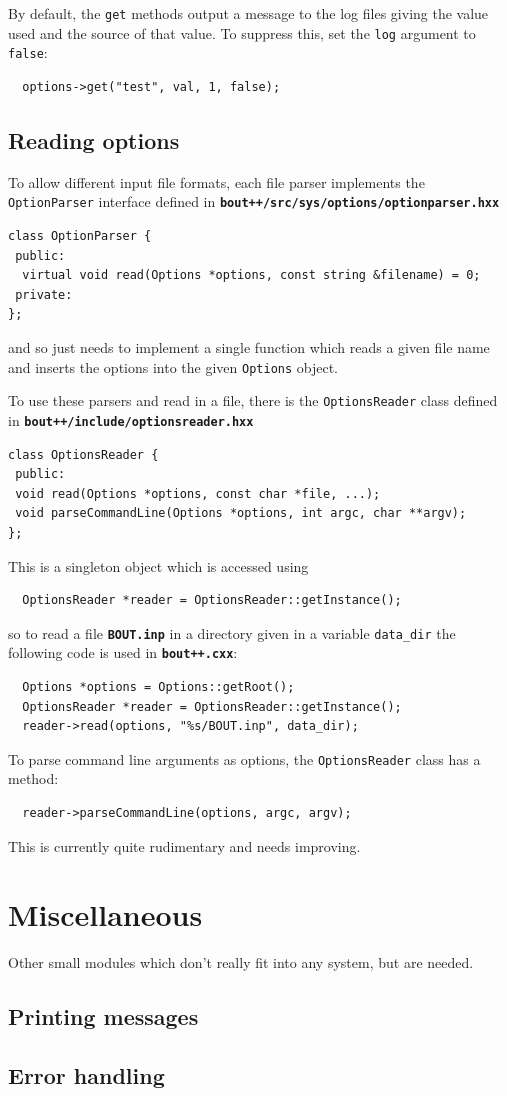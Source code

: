 \documentclass[12pt]{article}
\newcommand{\file}[1]{\texttt{\bf #1}}
\begin{document}
By default, the \lstinline!get! methods output a message to
the log files giving the value used and the source of that value.
To suppress this, set the \lstinline!log! argument to \lstinline!false!:
\begin{lstlisting}
  options->get("test", val, 1, false);
\end{lstlisting}

\subsection{Reading options}

To allow different input file formats, each file parser implements
the \lstinline!OptionParser! interface defined in
\file{bout++/src/sys/options/optionparser.hxx}
\begin{lstlisting}
class OptionParser {
 public:
  virtual void read(Options *options, const string &filename) = 0;
 private:
};
\end{lstlisting}
and so just needs to implement a single function which reads a
given file name and inserts the options into the given \lstinline!Options!
object.

To use these parsers and read in a file, there is the
\lstinline!OptionsReader! class defined in
\file{bout++/include/optionsreader.hxx} 
\begin{lstlisting}
class OptionsReader {
 public:
 void read(Options *options, const char *file, ...);
 void parseCommandLine(Options *options, int argc, char **argv);
};
\end{lstlisting}
This is a singleton object which is accessed using
\begin{lstlisting}
  OptionsReader *reader = OptionsReader::getInstance();
\end{lstlisting}
so to read a file \file{BOUT.inp} in a directory given in a variable
\lstinline!data_dir! the following code is used in \file{bout++.cxx}:
\begin{lstlisting}
  Options *options = Options::getRoot();
  OptionsReader *reader = OptionsReader::getInstance();
  reader->read(options, "%s/BOUT.inp", data_dir);
\end{lstlisting}

To parse command line arguments as options, the \lstinline!OptionsReader!
class has a method:
\begin{lstlisting}
  reader->parseCommandLine(options, argc, argv);
\end{lstlisting}
This is currently quite rudimentary and needs improving.

\section{Miscellaneous}

Other small modules which don't really fit into any system, but are needed.


\subsection{Printing messages}


\subsection{Error handling}




\printindex
\end{document}
